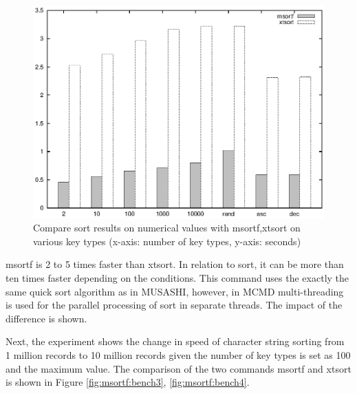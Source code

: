 \begin{figure}[hbt]
\begin{center}
\includegraphics[scale=.8]{figure/msortf/num.eps}
\end{center}
\vspace{10 mm}
\caption{Compare sort results on numerical values with msortf,xtsort on various key types (x-axis: number of key types, y-axis: seconds)\label{fig:msortf:bench2}}
\end{figure}

msortf is 2 to 5 times faster than xtsort. In relation to sort, it can be more than ten times faster depending on the conditions. This command uses the exactly the same quick sort algorithm as in MUSASHI, however, in MCMD multi-threading is used for the parallel processing of sort in separate threads. The impact of the difference is shown. 

Next, the experiment shows the change in speed of character string sorting from 1 million records to 10 million records given the number of key types is set as 100 and the maximum value. 
The comparison of the two commands msortf and xtsort is shown in Figure \ref{fig:msortf:bench3}, \ref{fig:msortf:bench4}. 



